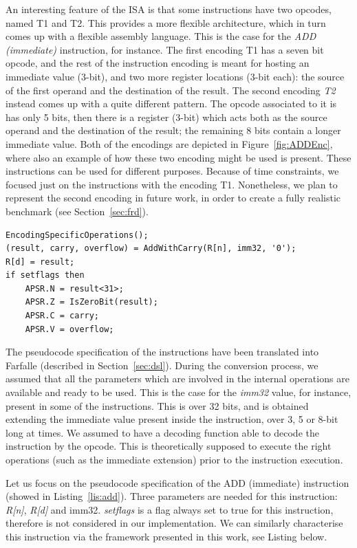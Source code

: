 \documentclass[conference]{IEEEtran}
\begin{document}
An interesting feature of the ISA is that some instructions have two opcodes, named T1 and
T2. This provides a more flexible architecture, which in turn comes up with a
flexible assembly language. This is the case for the \textit{ADD (immediate)} instruction,
for instance. The first encoding T1 has a seven bit opcode, and the rest of the
instruction encoding is meant for hosting an immediate value (3-bit), and two more register
locations (3-bit each): the source of the first operand and the destination of the result.
The second encoding \textit{T2} instead comes up with a quite different pattern. The opcode
associated to it is has only 5 bits, then there is a register (3-bit) which acts both as the
source operand and the destination of the result; the remaining 8 bits contain a longer
immediate value. Both of the encodings are depicted in Figure~\ref{fig:ADDEnc},
where also an example of how these two encoding might be used is present. These
instructions can be used for different purposes. Because of time constraints, we focused just
on the instructions with the encoding T1. Nonetheless, we plan to represent the
second encoding in future work, in order to create a fully realistic benchmark (see 
Section~\ref{sec:frd}).\\

\begin{lstlisting}[caption=ADD (immediate) instruction - Reference specification,
frame=single, label=lis:add]
EncodingSpecificOperations();
(result, carry, overflow) = AddWithCarry(R[n], imm32, '0');
R[d] = result;
if setflags then
    APSR.N = result<31>;
    APSR.Z = IsZeroBit(result);
    APSR.C = carry;
    APSR.V = overflow;
\end{lstlisting}

The pseudocode specification of the instructions have been translated into Farfalle 
(described in Section~\ref{sec:dsl}). During the conversion process, we
assumed that all the parameters which are involved in the internal operations are available
and ready to be used. This is the case for the \textit{imm32} value, for instance, present in
some of the instructions. This is over 32 bits, and is obtained extending the immediate value
present inside the instruction, over 3, 5 or 8-bit long at times. We assumed to have a
decoding function able to decode the instruction by the opcode. This is theoretically
supposed to execute the right operations (such as the immediate extension) prior to the
instruction execution.

Let us focus on the pseudocode specification of the ADD (immediate) instruction (showed in
Listing~\ref{lis:add}). Three parameters are needed for this instruction: \textit{R[n]},
\textit{R[d]} and imm32. \textit{setflags} is a flag always set to true for this instruction,
therefore is not considered in our implementation. We can similarly characterise this instruction
via the framework presented in this work, see Listing below.\\
\end{document}
